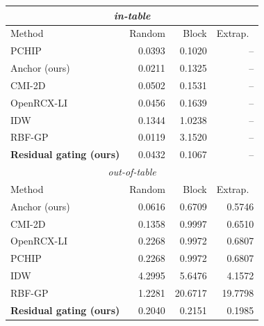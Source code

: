 \small
\begin{tabular}{lrrr}\toprule
\multicolumn{4}{c}{\emph{in-table}} \\\midrule
Method & Random & Block & Extrap.\ \\\midrule
PCHIP & 0.0393 & 0.1020 & -- \\
Anchor (ours) & 0.0211 & 0.1325 & -- \\
CMI-2D & 0.0502 & 0.1531 & -- \\
OpenRCX-LI & 0.0456 & 0.1639 & -- \\
IDW & 0.1344 & 1.0238 & -- \\
RBF-GP & 0.0119 & 3.1520 & -- \\
\textbf{Residual gating (ours)} & 0.0432 & 0.1067 & -- \\
\midrule\multicolumn{4}{c}{\emph{out-of-table}} \\\midrule
Method & Random & Block & Extrap.\ \\\midrule
Anchor (ours) & 0.0616 & 0.6709 & 0.5746 \\
CMI-2D & 0.1358 & 0.9997 & 0.6510 \\
OpenRCX-LI & 0.2268 & 0.9972 & 0.6807 \\
PCHIP & 0.2268 & 0.9972 & 0.6807 \\
IDW & 4.2995 & 5.6476 & 4.1572 \\
RBF-GP & 1.2281 & 20.6717 & 19.7798 \\
\textbf{Residual gating (ours)} & 0.2040 & 0.2151 & 0.1985 \\
\bottomrule\end{tabular}
